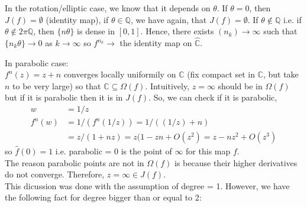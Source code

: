 \documentclass[a4paper, 11pt]{book}
\theoremstyle{definition}
\theoremstyle{remark}
\begin{document}
    In the rotation/elliptic case, we know that it depends on $\theta$. If $\theta = 0$, then $J(f)=\emptyset$ (identity map), if $\theta\in\mathbb{Q}$,
    we have again, that $J(f) = \emptyset$. If $\theta\not\in\mathbb{Q}$ i.e. if $\theta\not\in 2\pi\mathbb{Q}$, then $\{n\theta\}$ is dense in
    $[0,1]$. Hence, there exists $(n_k)\to\infty$ such that $\{n_k\theta\}\to 0$ as $k\to\infty$ so $f^{n_k}\to$ the identity map on $\hat{\mathbb{C}}$.
    \newline

    In parabolic case:\\
    $f^{n}(z) = z+n$ converges locally uniformily on $\mathbb{C}$ (fix compact set in $\mathbb{C}$, but take $n$ to be very large) so that
    $\mathbb{C}\subseteq \Omega(f)$. Intuitively, $z=\infty$ should be in $\Omega(f)$ but if it is parabolic then it is in $J(f)$. So, we can
    check if it is parabolic,
    \begin{align*}
        w &= 1/z \\
        f^{n}(w) &= 1/(f^n(1/z)) = 1/((1/z) + n) \\
        &= z/(1+nz) = z(1-zn + O(z^2) = z - nz^2 + O(z^3)
    \end{align*}
    so $\hat{f}(0)=1$ i.e. parabolic = 0 is the point of $\infty$ for this map $f$.\\

    The reason parabolic points are not in $\Omega(f)$ is because their higher derivatives do not converge. Therefore, $z=\infty\in J(f)$.\\

    This dicussion was done with the assumption of degree = 1. However, we have the following fact for degree bigger than or equal to 2:
\end{document}
